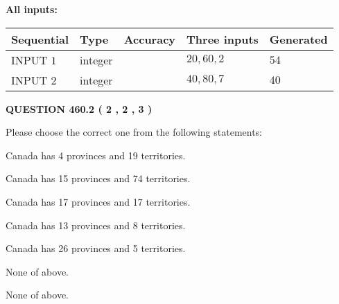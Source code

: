 \documentclass[12pt]{article}
\begin{document}
   
   
   
\noindent{}
   
   
   
   
\noindent\vspace{0.1in}\hspace{-0.08in} {\textbf{\Large{All inputs: }}}
   
   
  
  
\noindent\begin{tabular}{|l|l|l|l|l|}
\hline
 Sequential & Type & Accuracy & Three inputs & Generated \\ 
\hline
 
 
  INPUT $  1 $ & integer &  & $
 20
 , 
 60
 , 
 2
 $ & $ 54 $ 
 \\  \hline  
 
 
  INPUT $  2 $ & integer &  & $
 40
 , 
 80
 , 
 7
 $ & $ 40 $ 
 \\  \hline  
 \end{tabular}
   
   
  
\vspace{0.2in}
  
{\textbf{\Large{QUESTION
460.2 
 ( 2 , 2 , 3 )
}}}
  
  
Please choose the correct one from the following statements:
 
 
Canada has   4 provinces and  19 territories.
 
 
Canada has  15 provinces and  74 territories.
 
 
Canada has  17 provinces and  17 territories.
 
 
Canada has  13 provinces and  8 territories.
 
 
Canada has  26 provinces and  5 territories.
 
 
 None of above.
 
 
\noindent{}
 
 
 None of above.
 
 
\noindent{}
 
 
   
   
   
\end{document}
